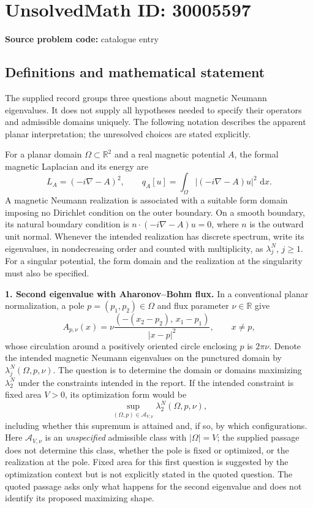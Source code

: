 \documentclass[11pt]{article}
\newcommand{\R}{\mathbb{R}}
\newcommand{\dd}{\,\mathrm{d}}
\begin{document}
\section*{UnsolvedMath ID: 30005597}
\textbf{Source problem code:} catalogue entry
\subsection{Definitions and mathematical statement}
The supplied record groups three questions about magnetic Neumann eigenvalues. It does not supply all hypotheses needed to specify their operators and admissible domains uniquely. The following notation describes the apparent planar interpretation; the unresolved choices are stated explicitly.

For a planar domain \(\Omega\subset\R^2\) and a real magnetic potential \(A\), the formal magnetic Laplacian and its energy are
\[
L_A=(-i\nabla-A)^2,\qquad q_A[u]=\int_\Omega|(-i\nabla-A)u|^2\,\dd x.
\]
A magnetic Neumann realization is associated with a suitable form domain imposing no Dirichlet condition on the outer boundary. On a smooth boundary, its natural boundary condition is \(n\cdot(-i\nabla-A)u=0\), where \(n\) is the outward unit normal. Whenever the intended realization has discrete spectrum, write its eigenvalues, in nondecreasing order and counted with multiplicity, as \(\lambda_j^N\), \(j\geq1\). For a singular potential, the form domain and the realization at the singularity must also be specified.

\textbf{1. Second eigenvalue with Aharonov--Bohm flux.}
In a conventional planar normalization, a pole \(p=(p_1,p_2)\in\Omega\) and flux parameter \(\nu\in\R\) give
\[
A_{p,\nu}(x)=\nu\frac{(-(x_2-p_2),\,x_1-p_1)}{|x-p|^2},\qquad x\neq p,
\]
whose circulation around a positively oriented circle enclosing \(p\) is \(2\pi\nu\). Denote the intended magnetic Neumann eigenvalues on the punctured domain by \(\lambda_j^N(\Omega,p,\nu)\). The question is to determine the domain or domains maximizing \(\lambda_2^N\) under the constraints intended in the report. If the intended constraint is fixed area \(V>0\), its optimization form would be
\[
\sup_{(\Omega,p)\in\mathcal A_{V,\nu}}\lambda_2^N(\Omega,p,\nu),
\]
including whether this supremum is attained and, if so, by which configurations. Here \(\mathcal A_{V,\nu}\) is an \emph{unspecified} admissible class with \(|\Omega|=V\); the supplied passage does not determine this class, whether the pole is fixed or optimized, or the realization at the pole. Fixed area for this first question is suggested by the optimization context but is not explicitly stated in the quoted question. The quoted passage asks only what happens for the second eigenvalue and does not identify its proposed maximizing shape.
\end{document}
